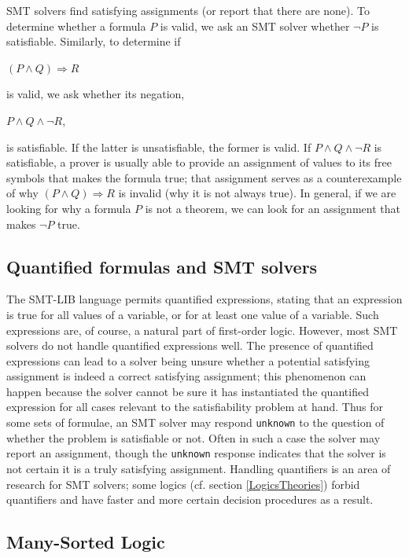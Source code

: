\documentclass[12pt,oneside]{report}
\newcommand{\logand}{{\wedge}}
\newcommand{\imp}{{\Rightarrow}}
\begin{document}
SMT solvers find satisfying assignments (or report that there are none). To determine whether a formula $P$ is valid, we ask an SMT solver whether $\lnot P$ is satisfiable.  Similarly, to determine if \\
\centerline{$(P \logand Q ) \imp R$}
is valid, we ask whether its negation, \\
\centerline{$P \logand Q \logand \lnot R$,}
is satisfiable. If the latter is unsatisfiable, the former is valid.
If $P \logand Q \logand \lnot R$ is satisfiable, a prover is usually able to provide an assignment of values to its
free symbols that makes the formula true; that assignment serves as a counterexample of why
$(P \logand Q ) \imp R$ is invalid (why it is not always true).  In general, if we are looking for why
a formula $P$ is not a theorem, we can look for an assignment that makes $\lnot P$ true.

\subsection{Quantified formulas and SMT solvers}
\label{Quantified}

The SMT-LIB language permits quantified expressions, stating that an expression is true for all values of a variable, or for at least one value of a variable. Such expressions are, of course, a natural part of first-order logic. However, most SMT solvers do not handle quantified expressions well. The presence of quantified expressions can lead to a solver being unsure whether a potential satisfying assignment is indeed a correct satisfying assignment; this phenomenon can happen because the solver cannot be sure it has instantiated the quantified expression for
all cases relevant to the satisfiability problem at hand. Thus for some sets of formulae, an SMT solver may respond {\tt unknown} to the question of whether the problem is satisfiable or not. Often in such a case the solver may report an assignment, though the {\tt unknown} 
response indicates that the solver is not certain it is a truly satisfying assignment.  Handling quantifiers is an
area of research for SMT solvers; some logics (cf. section \ref{LogicsTheories}) forbid quantifiers and have faster and more certain decision procedures as a result.


\subsection{Many-Sorted Logic}  
\end{document}

